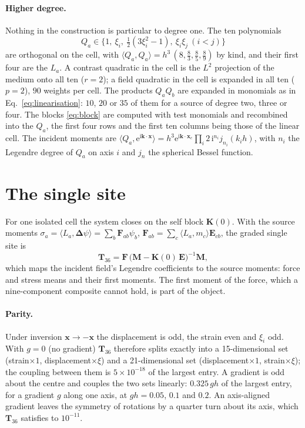 \documentclass[11pt,a4paper]{article}
\newcommand{\bK}{\mathbf{K}}
\newcommand{\bM}{\mathbf{M}}
\newcommand{\bE}{\mathbf{E}}
\newcommand{\bT}{\mathbf{T}}
\newcommand{\bD}{\boldsymbol{\Delta}}
\begin{document}
\paragraph{Higher degree.} Nothing in the construction is particular to degree one. The ten polynomials
\begin{equation}\label{eq:qbasis}
  Q_a\in\bigl\{1,\ \xi_i,\ \tfrac12(3\xi_i^2-1),\ \xi_i\xi_j\ (i<j)\bigr\}
\end{equation}
are orthogonal on the cell, with $\langle Q_a,Q_a\rangle=h^3\,(8,\tfrac83,\tfrac85,\tfrac89)$ by kind, and
their first four are the $L_a$. A contrast quadratic in the cell is the $L^2$ projection of the medium
onto all ten ($r=2$); a field quadratic in the cell is expanded in all ten ($p=2$), $90$ weights per cell.
The products $Q_aQ_b$ are expanded in monomials as in Eq.~\eqref{eq:linearisation}: $10$, $20$ or $35$
of them for a source of degree two, three or four. The blocks \eqref{eq:block} are computed with test
monomials and recombined into the $Q_a$, the first four rows and the first ten columns being those of the
linear cell. The incident moments are $\langle Q_a,\mathrm{e}^{\mathrm{i}\mathbf{k}\cdot\mathbf{x}}\rangle
=h^3\mathrm{e}^{\mathrm{i}\mathbf{k}\cdot\mathbf{x}_c}\prod_i2\,\mathrm{i}^{n_i}j_{n_i}(k_ih)$, with $n_i$
the Legendre degree of $Q_a$ on axis $i$ and $j_n$ the spherical Bessel function.

\section{The single site}\label{sec:site}

For one isolated cell the system closes on the self block $\bK(0)$. With the source moments
$\sigma_a=\langle L_a,\bD\psi\rangle=\sum_b\mathbf{F}_{ab}\psi_b$,
$\mathbf{F}_{ab}=\sum_c\langle L_a,m_c\rangle\bE_{cb}$, the graded single site is
\begin{equation}\label{eq:t36}
  \bT_{36}=\mathbf{F}\,\bigl(\bM-\bK(0)\,\bE\bigr)^{-1}\bM ,
\end{equation}
which maps the incident field's Legendre coefficients to the source moments: force and stress means and
their first moments. The first moment of the force, which a nine-component composite cannot hold, is part
of the object.

\paragraph{Parity.} Under inversion $\mathbf{x}\to-\mathbf{x}$ the displacement is odd, the strain even
and $\xi_i$ odd. With $g=0$ (no gradient) $\bT_{36}$ therefore splits exactly into a 15-dimensional set
(strain$\times1$, displacement$\times\xi$) and a 21-dimensional set (displacement$\times1$,
strain$\times\xi$); the coupling between them is $5\times10^{-18}$ of the largest entry. A gradient is odd
about the centre and couples the two sets linearly: $0.325\,gh$ of the largest entry, for a gradient $g$
along one axis, at $gh=0.05$, $0.1$ and $0.2$. An axis-aligned gradient leaves the symmetry of rotations by
a quarter turn about its axis, which $\bT_{36}$ satisfies to $10^{-11}$.
\end{document}
